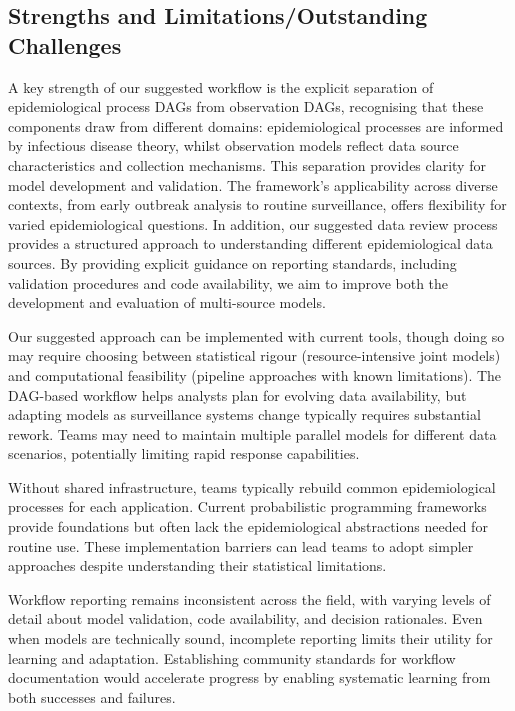 \documentclass{article}
\begin{document}
\subsection{Strengths and Limitations/Outstanding Challenges}

A key strength of our suggested workflow is the explicit separation of epidemiological process DAGs from observation DAGs, recognising that these components draw from different domains: epidemiological processes are informed by infectious disease theory, whilst observation models reflect data source characteristics and collection mechanisms.
This separation provides clarity for model development and validation.
The framework's applicability across diverse contexts, from early outbreak analysis to routine surveillance, offers flexibility for varied epidemiological questions.
In addition, our suggested data review process provides a structured approach to understanding different epidemiological data sources.
By providing explicit guidance on reporting standards, including validation procedures and code availability, we aim to improve both the development and evaluation of multi-source models.

Our suggested approach can be implemented with current tools, though doing so may require choosing between statistical rigour (resource-intensive joint models) and computational feasibility (pipeline approaches with known limitations).
The DAG-based workflow helps analysts plan for evolving data availability, but adapting models as surveillance systems change typically requires substantial rework.
Teams may need to maintain multiple parallel models for different data scenarios, potentially limiting rapid response capabilities.

Without shared infrastructure, teams typically rebuild common epidemiological processes for each application.
Current probabilistic programming frameworks provide foundations but often lack the epidemiological abstractions needed for routine use.
These implementation barriers can lead teams to adopt simpler approaches despite understanding their statistical limitations.

Workflow reporting remains inconsistent across the field, with varying levels of detail about model validation, code availability, and decision rationales.
Even when models are technically sound, incomplete reporting limits their utility for learning and adaptation.
Establishing community standards for workflow documentation would accelerate progress by enabling systematic learning from both successes and failures.
\end{document}
